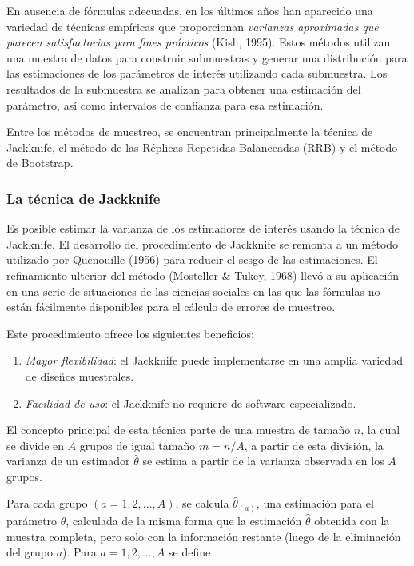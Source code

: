 \documentclass[
  12pt,
  spanish,
]{book}
\providecommand{\tightlist}{%
  \setlength{\itemsep}{0pt}\setlength{\parskip}{0pt}}
\begin{document}
En ausencia de fórmulas adecuadas, en los últimos años han aparecido una variedad de técnicas empíricas que proporcionan \emph{varianzas aproximadas que parecen satisfactorias para fines prácticos} (Kish, 1995). Estos métodos utilizan una muestra de datos para construir submuestras y generar una distribución para las estimaciones de los parámetros de interés utilizando cada submuestra. Los resultados de la submuestra se analizan para obtener una estimación del parámetro, así como intervalos de confianza para esa estimación.

Entre los métodos de muestreo, se encuentran principalmente la técnica de Jackknife, el método de las Réplicas Repetidas Balanceadas (RRB) y el método de Bootstrap.

\hypertarget{la-tuxe9cnica-de-jackknife}{%
\subsubsection*{La técnica de Jackknife}\label{la-tuxe9cnica-de-jackknife}}

Es posible estimar la varianza de los estimadores de interés usando la técnica de Jackknife. El desarrollo del procedimiento de Jackknife se remonta a un método utilizado por Quenouille (1956) para reducir el sesgo de las estimaciones. El refinamiento ulterior del método (Mosteller \& Tukey, 1968) llevó a su aplicación en una serie de situaciones de las ciencias sociales en las que las fórmulas no están fácilmente disponibles para el cálculo de errores de muestreo.

Este procedimiento ofrece los siguientes beneficios:

\begin{enumerate}
\def\labelenumi{\arabic{enumi}.}
\tightlist
\item
  \emph{Mayor flexibilidad}: el Jackknife puede implementarse en una amplia variedad de diseños muestrales.
\item
  \emph{Facilidad de uso}: el Jackknife no requiere de software especializado.
\end{enumerate}

El concepto principal de esta técnica parte de una muestra de tamaño \(n\), la cual se divide en \(A\) grupos de igual
tamaño \(m=n/A\), a partir de esta división, la varianza de un estimador \(\hat{\theta}\) se estima a partir de la varianza observada en los \(A\) grupos.

Para cada grupo \((a=1,2,...,A)\), se calcula \(\hat{\theta}_{(a)}\), una estimación para el parámetro \(\theta\), calculada de la misma forma que la estimación \(\hat{\theta}\) obtenida con la muestra completa, pero solo con la información restante (luego de la eliminación del grupo \(a\)). Para \(a=1,2,...,A\) se define
\end{document}
